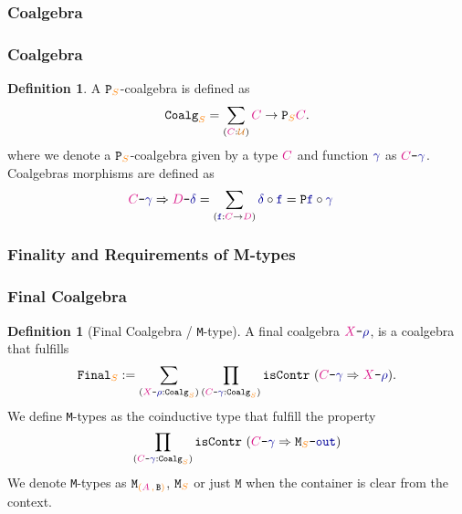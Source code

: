 \documentclass[xelatex,mathserif,serif,notheorems]{beamer} %
\theoremstyle{plain} %
\theoremstyle{definition}
\newtheorem{defn}[thm]{Definition}%
\theoremstyle{remark}
\newcommand*{\type}[1]{\textcolor{magenta!90!black}{#1}}
\newcommand*{\container}[1]{\textcolor{orange}{#1}}
\newcommand*{\containerpair}[2]{\ensuremath{\colorlet{savedleftcolor}{.}\color{orange}\left(\color{savedleftcolor}#1\,\textcolor{orange}{\mathbf{,}}\,#2\color{orange}\right)\color{savedleftcolor}}}
\newcommand*{\universe}[1]{\textcolor{orange!80!black}{#1}}
\newcommand*{\coalg}[2]{#1\texttt{-}#2}
\newcommand*{\function}[1]{\textcolor{blue!60!black}{\ensuremath{\mathtt{#1}}}}
\newcommand*{\typeformer}[1]{\ensuremath{\mathtt{#1}}}
\newcommand*{\functor}[1]{\ensuremath{\mathbf{\mathtt{#1}}}}
\newcommand{\setlengths}{
  \setlength{\abovedisplayskip}{4pt}
  \setlength{\belowdisplayskip}{4pt}
  \setlength{\abovedisplayshortskip}{2pt}
  \setlength{\belowdisplayshortskip}{2pt}
}
\begin{document}
\subsubsection{Coalgebra}
\begin{frame}
  \frametitle{Coalgebra}
  \begin{defn}\setlengths
    A \(\functor{P}_{\container{S}}\)-coalgebra is defined as
    \begin{equation}
      \typeformer{Coalg}_{\container{S}} = \sum_{(\type{C} : \universe{\mathcal{U}})} \type{C} \rightarrow \functor{P}_{\container{S}}\type{C}.
    \end{equation}
    where we denote a \(\functor{P}_{\container{S}}\)-coalgebra given by a type \(\type{C}\) and function \(\function{\gamma}\) as \(\coalg{\type{C}}{\function{\gamma}}\). Coalgebras morphisms are defined as
    \begin{equation}
      \begin{aligned}
        \coalg{\type{C}}{\function{\gamma}} \Rightarrow \coalg{\type{D}}{\function{\delta}} &= \sum_{(\function{f} : \type{C} \rightarrow \type{D})} \function{\delta} \circ \function{f} = \functor{P} \function{f} \circ \function{\gamma}
      \end{aligned}
    \end{equation}
  \end{defn}
\end{frame}

\subsubsection{Finality and Requirements of M-types}
\begin{frame}
  \frametitle{Final Coalgebra}
  \begin{defn}[Final Coalgebra / \texttt{M}-type]\setlengths
    A final coalgebra \(\coalg{\type{X}}{\function{\rho}}\), is a coalgebra that fulfills
    \begin{equation}
      \typeformer{Final}_{\container{S}} := \sum_{(\coalg{\type{X}}{\function{\rho}} : \mathtt{Coalg}_{\container{S}})} \prod_{(\coalg{\type{C}}{\function{\gamma}} : \mathtt{Coalg}_{\container{S}})} \mathtt{isContr}~(\coalg{\type{C}}{\function{\gamma}} \Rightarrow \coalg{\type{X}}{\function{\rho}}).
    \end{equation}
    \label{defn:M-type-final-def}
    We define \texttt{M}-types as the coinductive type that fulfill the property
    \begin{equation}
      \prod_{(\coalg{\type{C}}{\function{\gamma}} : \mathtt{Coalg}_{\container{S}})} \mathtt{isContr}~(\coalg{\type{C}}{\function{\gamma}} \Rightarrow \coalg{\typeformer{M}_{\container{S}}}{\function{out}})
    \end{equation}
    We denote \texttt{M}-types as \(\typeformer{M}_{\containerpair{\type{A}}{\typeformer{B}}}\), \(\typeformer{M}_{\container{S}}\) or just \(\typeformer{M}\) when the container is clear from the context.
  \end{defn}
\end{frame}
\end{document}
